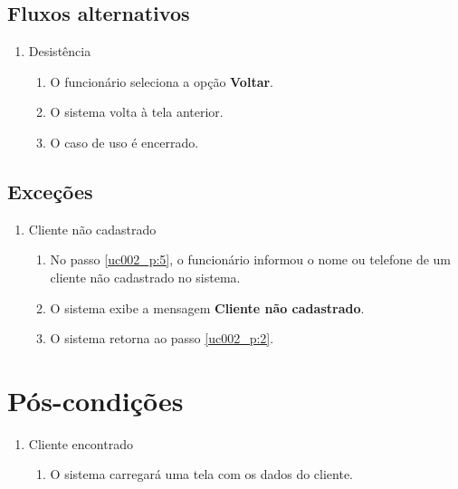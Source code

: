\subsection{Fluxos alternativos}

\begin{enumerate}[label=A\arabic*]
	\item Desistência
	\begin{enumerate}[label*=.\arabic*]
		\item O funcionário seleciona a opção \textbf{Voltar}.
		\item O sistema volta à tela anterior.
		\item O caso de uso é encerrado.		
	\end{enumerate}	
\end{enumerate}

\subsection{Exceções}

\begin{enumerate}[label=E\arabic*]
	\item Cliente não cadastrado \label{uc002_e:1}
	\begin{enumerate}[label*=.\arabic*]
		\item[] No passo \ref{uc002_p:5}, o funcionário informou o nome ou telefone de um cliente não cadastrado no sistema.
		\item O sistema exibe a mensagem \textbf{Cliente não cadastrado}.
		\item O sistema retorna ao passo \ref{uc002_p:2}.
	\end{enumerate}
\end{enumerate}

\section{Pós-condições}

\begin{enumerate}
	\item Cliente encontrado
	\begin{enumerate}
		\item O sistema carregará uma tela com os dados do cliente.
	\end{enumerate}
\end{enumerate}